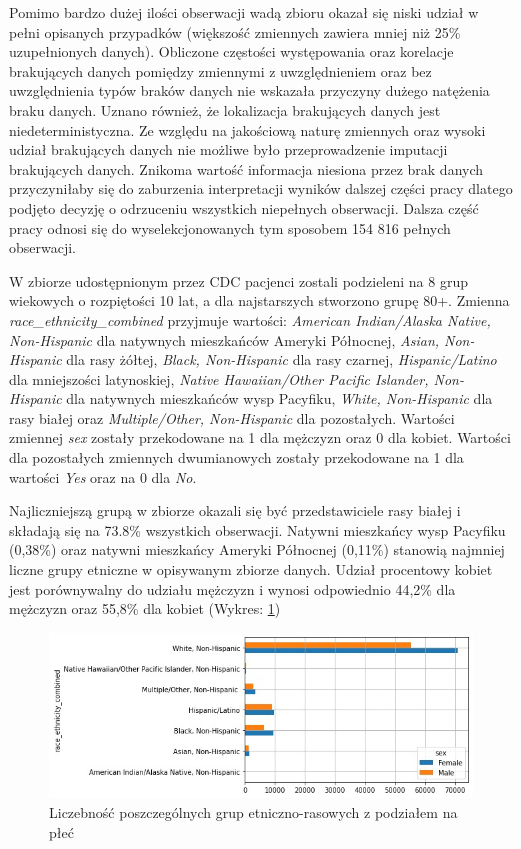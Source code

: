 \documentclass[polish, twoside, 12pt, a4paper]{article}
\theoremstyle{definition}
\theoremstyle{plain}
\theoremstyle{remark}
\begin{document}
Pomimo bardzo dużej ilości obserwacji wadą zbioru okazał się niski udział w pełni opisanych przypadków (większość zmiennych zawiera mniej niż 25\% uzupełnionych danych). Obliczone częstości występowania oraz korelacje brakujących danych pomiędzy zmiennymi z uwzględnieniem oraz bez uwzględnienia typów braków danych nie wskazała przyczyny dużego natężenia braku danych. Uznano również, że lokalizacja brakujących danych jest niedeterministyczna. Ze względu na jakościową naturę zmiennych oraz wysoki udział brakujących danych nie możliwe było przeprowadzenie imputacji brakujących danych. Znikoma wartość informacja niesiona przez brak danych przyczyniłaby się do zaburzenia interpretacji wyników dalszej części pracy dlatego podjęto decyzję o odrzuceniu wszystkich niepełnych obserwacji. Dalsza część pracy odnosi się do wyselekcjonowanych tym sposobem 154 816 pełnych obserwacji. 

W zbiorze udostępnionym przez CDC pacjenci zostali podzieleni na 8 grup wiekowych o rozpiętości 10 lat, a dla najstarszych stworzono grupę 80+. Zmienna \emph{race\_ethnicity\_combined} przyjmuje wartości: \emph{American Indian/Alaska Native, Non-Hispanic} dla natywnych mieszkańców Ameryki Północnej, \emph{Asian, Non-Hispanic} dla rasy żółtej, \emph{Black, Non-Hispanic} dla rasy czarnej, \emph{Hispanic/Latino} dla mniejszości latynoskiej, \emph{Native Hawaiian/Other Pacific Islander, Non-Hispanic} dla natywnych mieszkańców wysp Pacyfiku, \emph{White, Non-Hispanic} dla rasy białej oraz \emph{Multiple/Other, Non-Hispanic} dla pozostałych. Wartości zmiennej \emph{sex} zostały przekodowane na 1 dla mężczyzn oraz 0 dla kobiet. Wartości dla pozostałych zmiennych dwumianowych zostały przekodowane na 1 dla wartości \emph{Yes} oraz na 0 dla \emph{No}.

Najliczniejszą grupą w zbiorze okazali się być przedstawiciele rasy białej i składają się na 73.8\% wszystkich obserwacji. Natywni mieszkańcy wysp Pacyfiku (0,38\%) oraz natywni mieszkańcy Ameryki Północnej (0,11\%) stanowią najmniej liczne grupy etniczne w opisywanym zbiorze danych. Udział procentowy kobiet jest porównywalny do udziału mężczyzn i wynosi odpowiednio 44,2\% dla mężczyzn oraz 55,8\% dla kobiet (Wykres: \ref{figure:sex-race-count})

\begin{figure}[H]
\centering
\includegraphics[width=15cm]{race_sex_count_plot.jpg}
\caption{Liczebność poszczególnych grup etniczno-rasowych z podziałem na płeć}
\label{figure:sex-race-count}
\end{figure}
\end{document}
